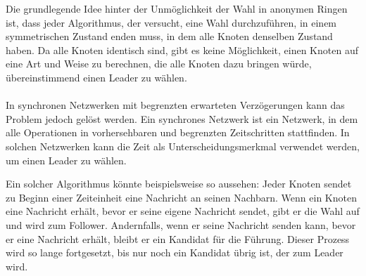 Die grundlegende Idee hinter der Unmöglichkeit der Wahl in anonymen Ringen ist, dass jeder Algorithmus, der versucht, eine Wahl durchzuführen, in einem symmetrischen Zustand enden muss, in dem alle Knoten denselben Zustand haben. Da alle Knoten identisch sind, gibt es keine Möglichkeit, einen Knoten auf eine Art und Weise zu berechnen, die alle Knoten dazu bringen würde, übereinstimmend einen Leader zu wählen.
\\\\
In synchronen Netzwerken mit begrenzten erwarteten Verzögerungen kann das Problem jedoch gelöst werden. Ein synchrones Netzwerk ist ein Netzwerk, in dem alle Operationen in vorhersehbaren und begrenzten Zeitschritten stattfinden. In solchen Netzwerken kann die Zeit als Unterscheidungsmerkmal verwendet werden, um einen Leader zu wählen.

Ein solcher Algorithmus könnte beispielsweise so aussehen: Jeder Knoten sendet zu Beginn einer Zeiteinheit eine Nachricht an seinen Nachbarn. Wenn ein Knoten eine Nachricht erhält, bevor er seine eigene Nachricht sendet, gibt er die Wahl auf und wird zum Follower. Andernfalls, wenn er seine Nachricht senden kann, bevor er eine Nachricht erhält, bleibt er ein Kandidat für die Führung. Dieser Prozess wird so lange fortgesetzt, bis nur noch ein Kandidat übrig ist, der zum Leader wird.

